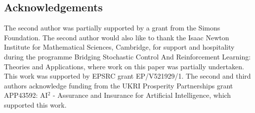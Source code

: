 \documentclass{amsart}
\theoremstyle{definition}
\begin{document}
\subsection*{Acknowledgements}
The second author was partially supported by a grant from the Simons Foundation.
The second author would also like to thank the Isaac Newton Institute for Mathematical Sciences, Cambridge, for support and hospitality during the programme Bridging Stochastic Control And Reinforcement Learning: Theories and Applications, where work on this paper was partially undertaken. This work was supported by EPSRC grant EP/V521929/1.
The second and third authors acknowledge funding from the UKRI Prosperity Partnerships grant APP43592: AI$^2$ - Assurance and Insurance for Artificial Intelligence, which supported this work.




 
\end{document}
